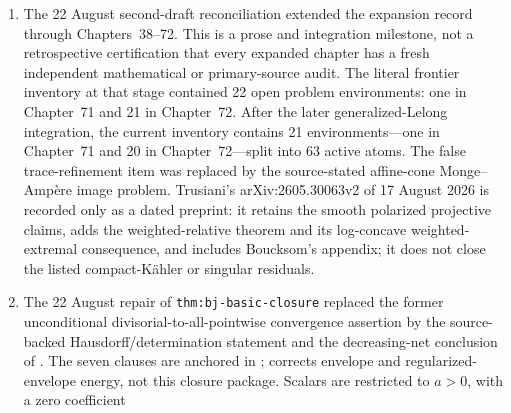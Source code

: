 \begin{enumerate}
  receipt is invalid for this packet: it records a different statement
  digest, hashes the source-rejected artifact, and points to a nonexistent
  \texttt{blueprint\_verified.md}.  The superficially similar
  correct receipt at timestamp \texttt{20260814T181019Z} has statement
  digest \texttt{3beefd...} and belongs to the unrelated MPWN dual-complex
  repair.  A hostile primary-source audit also found that DXZ
  Proposition~3.1 is stated in the projective big-class subsection,
  Theorem~3.17 concerns finite energy rather than positive-volume recovery,
  and MP Section~5.2 does not state an unrestricted full-cone comparison.
  Chapter~71 therefore removes all nine \texttt{RETHLAS-NEW} markers,
  retains the finite-energy MP--DXZ correspondence and Xia's divisorial
  order-reflection theorem at their exact scope, and records the full
  projective MP--DXZ comparison and nondivisorial MP regularity as open.
\item The 22 August second-draft reconciliation extended the expansion record
  through Chapters~38--72.  This is a prose and integration milestone, not a
  retrospective certification that every expanded chapter has a fresh
  independent mathematical or primary-source audit.  The literal frontier
  inventory at that stage contained 22 open problem environments: one in
  Chapter~71 and 21 in Chapter~72.  After the later generalized-Lelong
  integration, the current inventory contains 21 environments---one in
  Chapter~71 and 20 in Chapter~72---split into 63 active atoms.  The false
  trace-refinement item was replaced by the
  source-stated affine-cone Monge--Amp\`ere image problem.  Trusiani's
  arXiv:2605.30063v2 of 17 August 2026 is
  recorded only as a dated preprint: it retains the smooth polarized
  projective claims, adds the weighted-relative theorem and its log-concave
  weighted-extremal consequence, and includes Boucksom's appendix; it does
  not close the listed compact-K\"ahler or singular residuals.
\item The 22 August repair of \texttt{thm:bj-basic-closure} replaced the
  former unconditional divisorial-to-all-pointwise convergence assertion by
  the source-backed Hausdorff/determination statement and the decreasing-net
  conclusion of \cite[Corollary~4.25]{BJ22}.  The seven clauses are anchored
  in \cite[Definition~4.1, Theorem~4.5, Lemmas~4.6 and~4.9,
  Theorem~4.7, Corollary~4.17, Theorem~4.22, and Corollaries~4.23 and~4.25]{BJ22};
  \cite{BJ22b} corrects envelope and regularized-envelope energy, not this
  closure package.  Scalars are restricted to \(a>0\), with a zero coefficient

\end{enumerate}
